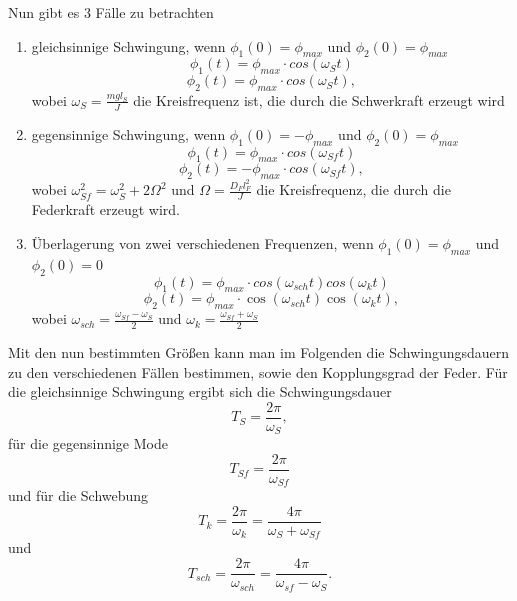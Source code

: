 \documentclass[a4paper, 11pt]{article}
\begin{document}
Nun gibt es 3 Fälle zu betrachten

\begin{enumerate}
	\item gleichsinnige Schwingung, wenn $\phi_1(0) = \phi_{max}$ und $\phi_2(0) = \phi_{max}$
	\begin{equation}
	\phi_1(t) = \phi_{max} \cdot cos(\omega_S t)
	\end{equation}  
	\begin{equation}
	\phi_2(t) = \phi_{max} \cdot cos(\omega_S t),
	\end{equation}
	wobei $\omega_S = \frac{mgl_S}{J}$ die Kreisfrequenz ist, die durch die Schwerkraft erzeugt wird
	
	\item gegensinnige Schwingung, wenn $\phi_1(0) = -\phi_{max}$ und $\phi_2(0) = \phi_{max}$
	\begin{equation}
	\phi_1(t) = \phi_{max} \cdot cos(\omega_{Sf} t)
	\end{equation}
	\begin{equation}
	\phi_2(t) = -\phi_{max} \cdot cos(\omega_{Sf} t),
	\end{equation}
	wobei $\omega_{Sf}^2 = \omega_S^2 + 2\Omega^2$ und $\Omega = \frac{D_Fl_F^2}{J}$ die Kreisfrequenz, die durch die Federkraft erzeugt wird.
	
	\item Überlagerung von zwei verschiedenen Frequenzen, wenn $\phi_1(0) = \phi_{max}$ und $\phi_2(0) = 0$
	\begin{equation}
	\phi_1(t) = \phi_{max} \cdot cos(\omega_{sch} t)cos(\omega_k t)
	\end{equation}
	\begin{equation}
	\phi_2(t) = \phi_{max} \cdot \cos(\omega_{sch} t)\cos(\omega_k t),
	\end{equation}
	wobei $\omega_{sch} = \frac{\omega_{Sf} - \omega_S}{2}$ und $\omega_k = \frac{\omega_{Sf} + \omega_S}{2}$
\end{enumerate}

Mit den nun bestimmten Größen kann man im Folgenden die Schwingungsdauern zu den verschiedenen Fällen bestimmen, sowie den Kopplungsgrad der Feder. Für die gleichsinnige Schwingung ergibt sich die Schwingungsdauer
\begin{equation}
T_S = \frac{2\pi}{\omega_S},
\end{equation}
für die gegensinnige Mode 
\begin{equation}
T_{Sf} = \frac{2\pi}{\omega_{Sf}}
\end{equation}
und für die Schwebung
\begin{equation}
T_k = \frac{2\pi}{\omega_k} = \frac{4\pi}{\omega_S + \omega_{Sf}}
\end{equation}
und 
\begin{equation}
T_{sch} = \frac{2\pi}{\omega_{sch}} = \frac{4\pi}{\omega_{sf} - \omega_S}.
\end{equation}
\end{document}
